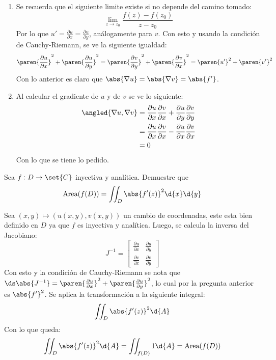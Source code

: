 \documentclass{homework}
\begin{document}
\begin{sol}
    \begin{enumerate}
        \item Se recuerda que el siguiente limite existe si no depende del camino tomado:
              \[\lim_{z\rightarrow z_0}\frac{f(z)-f(z_0)}{z-z_0}\]
              Por lo que \(u'=\frac{\partial u}{\partial x}=\frac{\partial u}{\partial y}\), análogamente para \(v\). Con esto y usando la condición de Cauchy-Riemann, se ve la siguiente igualdad:
              \[\paren{\frac{\partial u}{\partial x}}^2+\paren{\frac{\partial u}{\partial y}}^2=\paren{\frac{\partial v}{\partial y}}^2+\paren{\frac{\partial v}{\partial x}}^2=\paren{u'}^2+\paren{v'}^2\]
              Con lo anterior es claro que \(\abs{\nabla u}=\abs{\nabla v}=\abs{f'}\).
        \item Al calcular el gradiente de \(u\) y de \(v\) se ve lo siguiente:
              \begin{align*}
                  \angled{\nabla u,\nabla v} & = \frac{\partial u}{\partial x}\frac{\partial v}{\partial x}+\frac{\partial u}{\partial y}\frac{\partial v}{\partial y} \\
                                             & =\frac{\partial u}{\partial x}\frac{\partial v}{\partial x}-\frac{\partial u}{\partial x}\frac{\partial v}{\partial x}  \\
                                             & =0
              \end{align*}
              Con lo que se tiene lo pedido.
    \end{enumerate}
\end{sol}

\begin{prob}
    Sea \(f:D\rightarrow\set{C}\) inyectiva y analítica. Demuestre que
    \[\text{Area}(f(D))=\iint_D\abs{f'(z)}^2\d{x}\d{y}\]
\end{prob}

\begin{sol}
    Sea \((x,y)\mapsto(u(x,y),v(x,y))\) un cambio de coordenadas, este esta bien definido en \(D\) ya que \(f\) es inyectiva y analítica. Luego, se calcula la inversa del Jacobiano:
    \[J^{-1}=\begin{bmatrix}
            \frac{\partial u}{\partial x} & \frac{\partial u}{\partial y} \\
            \frac{\partial v}{\partial x} & \frac{\partial v}{\partial y}
        \end{bmatrix}\]
    Con esto y la condición de Cauchy-Riemann se nota que \(\ds\abs{J^{-1}}=\paren{\frac{\partial u}{\partial x}}^2+\paren{\frac{\partial u}{\partial y}}^2\), lo cual por la pregunta anterior es \(\abs{f'}^2\). Se aplica la transformación a la siguiente integral:
    \[\iint_D\abs{f'(z)}^2\d{A}\]
    Con lo que queda:
    \[\iint_D\abs{f'(z)}^2\d{A}=\iint_{f(D)}1\d{A}=\text{Area}(f(D))\]
\end{sol}
\end{document}

